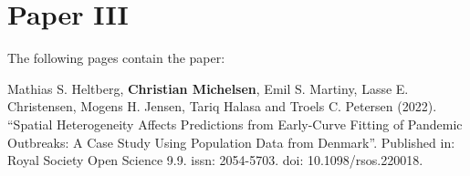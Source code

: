 \chapter{Paper III}
\label{chapter:covid19-agent-based-model}

The following  pages contain the paper:
\vspace*{1cm}


Mathias S. Heltberg, \textbf{Christian Michelsen}, Emil S. Martiny, Lasse E. Christensen, Mogens H. Jensen, Tariq Halasa and Troels C. Petersen (2022). ``Spatial Heterogeneity Affects Predictions from Early-Curve Fitting of Pandemic Outbreaks: A Case Study Using Population Data from Denmark''. Published in: Royal Society Open Science 9.9. issn: 2054-5703. doi: 10.1098/rsos.220018.

\clearpage
